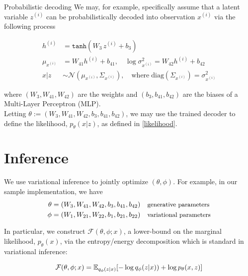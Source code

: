 \documentclass[10pt]{beamer}
\newcommand{\obs}{x^{(i)} }
\newcommand{\alatent}{z^{(i)} }
\newcommand{\N}{\mathcal{N}}
\begin{document}
\begin{frame}{Probabilistic decoding}
We may, for example, specifically assume that a latent variable $\alatent$ can be probabilistically decoded into  observation $\obs$ via the following process

\begin{align*}
h^{(i)} &= \texttt{tanh} (W_3 \, \alatent + b_3) \\
\mu_{\obs}&= W_{41} h^{(i)} + b_{41}, \quad \log \sigma^2_{\obs} = W_{42}h^{(i)}+b_{42} \\
x|z &\sim \N(\mu_{\obs}, \Sigma_{\obs}), \quad \text{where} \; \text{diag}(\Sigma_{\obs}) = \sigma_{\obs}^2
\end{align*}

where $(W_3, W_{41}, W_{42})$ are the weights and $(b_3, b_{41}, b_{42})$ are the biases of a Multi-Layer Perceptron (MLP). \\
\vfill
 Letting $\theta := (W_3, W_{41}, W_{42}, b_3, b_{41}, b_{42})$, we may use the trained decoder to define the likelihood, $p_\theta(x |z )$, as defined in \eqref{likelihood}.

\end{frame}




\section{Inference}

\begin{frame}{}
We use variational inference to jointly optimize $(\theta, \phi)$.  For example, in our sample implementation, we have 
\begin{align*}
\theta &= (W_3, W_{41}, W_{42}, b_3, b_{41}, b_{42})  && \small \text{generative parameters} \\ 
\phi &= (W_1, W_{21}, W_{22}, b_1, b_{21}, b_{22}) && \small \text{variational parameters}
\end{align*}

In particular, we construct $\mathcal{F}(\theta, \phi; x)$, a lower-bound on the marginal likelihood, $p_\theta(x)$, via the entropy/energy decomposition which is standard in variational inference:   

\begin{equation}
\label{vae_vlbo}
\mathcal{F}(\theta, \phi; x) = \mathbb{E}_{q_\phi(z| x)} [- \log q_\phi(z| x)) + \log p_\theta(x, z ) ]
\end{equation} 
\end{frame}
\end{document}
